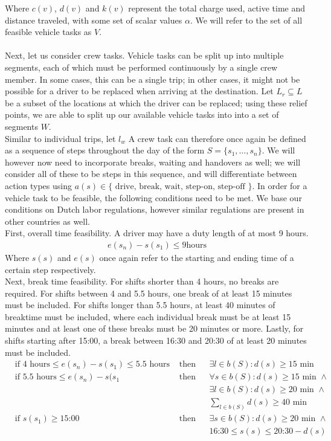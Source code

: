 \documentclass[]{article}
\begin{document}
Where $c(v)$, $d(v)$ and $k(v)$ represent the total charge used, active time and distance traveled, with some set of scalar values $\alpha$. We will refer to the set of all feasible vehicle tasks as $V$. \\\\
Next, let us consider crew tasks. Vehicle tasks can be split up into multiple segments, each of which must be performed continuously by a single crew member. In some cases, this can be a single trip; in other cases, it might not be possible for a driver to be replaced when arriving at the destination. Let $L_r \subseteq L$ be a subset of the locations at which the driver can be replaced; using these relief points, we are able to split up our available vehicle tasks into into a set of segments $W$. \\
Similar to individual trips, let $l_w$
A crew task can therefore once again be defined as a sequence of steps throughout the day of the form $S = \{ s_1, \dots, s_n \}$. We will however now need to incorporate breaks, waiting and handovers as well; we will consider all of these to be steps in this sequence, and will differentiate between action types using $a(s) \in \{\text{ drive, break, wait, step-on, step-off }\}$. In order for a vehicle task to be feasible, the following conditions need to be met. We base our conditions on Dutch labor regulations, however similar regulations are present in other countries as well. \\ 
First, overall time feasibility. A driver may have a duty length of at most 9 hours. \\
\begin{align}
  e(s_n) - s(s_1) \leq 9\text{hours}
\end{align}
Where $s(s)$ and $e(s)$ once again refer to the starting and ending time of a certain step respectively. \\
Next, break time feasibility. For shifts shorter than 4 hours, no breaks are required. For shifts between 4 and 5.5 hours, one break of at least 15 minutes must be included. For shifts longer than 5.5 hours, at least 40 minutes of breaktime must be included, where each individual break must be at least 15 minutes and at least one of these breaks must be 20 minutes or more. Lastly, for shifts starting after 15:00, a break between 16:30 and 20:30 of at least 20 minutes must be included. 
\begin{align}
  &\text{if } 4 \text{ hours} \leq e(s_n) - s(s_1) \leq 5.5 \text{ hours}&\text{ then} && \exists l \in b(S) : d(s) \geq 15 \text{ min} \\
  &\text{if } 5.5 \text{ hours} \leq e(s_n) - s(s_1 &\text{ then} && \forall s \in b(S) : d(s) \geq 15\text{ min } \land \\
  &&&& \exists l \in b(S) : d(s) \geq 20 \text{ min } \land \\
  &&&& \sum_{l \in b(S)}d(s) \geq 40 \text{ min} \\
  &\text{if } s(s_1) \geq \text{15:00} &\text{ then} && \exists s \in b(S) : d(s) \geq 20 \text{ min } \land \\
  &&&& \text{16:30} \leq s(s) \leq \text{20:30} - d(s)  \\
\end{align}
\end{document}
